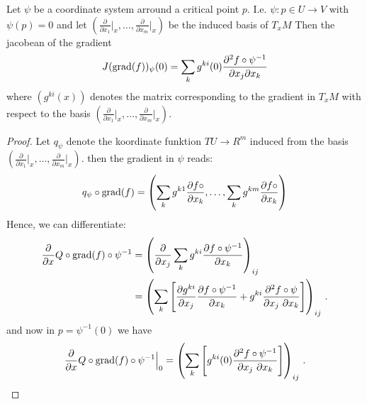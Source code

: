 \begin{lemma}
	Let $\psi$ be a coordinate system arround a critical point $p$. I.e. $\psi: p\in U\to V$ with $\psi(p)=0$ and let $\left( \frac{\partial}{\partial x_1}\big|_x,\dots ,\frac{\partial}{\partial x_m}\big|_x\right)$ be the induced basis of $T_xM$ Then the jacobean of the gradient 
	\begin{equation}
			J(\mathrm{grad}(f))_\psi(0)= \sum_{k}g^{ki}(0)\frac{\partial ^2 f\circ \psi^{-1} }{\partial x_j \partial x_k}
	\end{equation} where $(g^{ki}(x))$ denotes the matrix corresponding to the gradient in $T_xM$ with respect to the basis $\left( \frac{\partial}{\partial x_1}\big|_x,\dots ,\frac{\partial}{\partial x_m}\big|_x\right)$.
\end{lemma}
\begin{proof}
	Let $q_{\psi}$ denote the koordinate funktion $TU\to R^m$ induced from the basis $\left( \frac{\partial}{\partial x_1}\big|_x,\dots ,\frac{\partial}{\partial x_m}\big|_x\right)$. then the gradient in $\psi$ reads:
	\begin{align*}
		q_{\psi}\circ \mathrm{grad}(f)=\left(\sum_kg^{k1  }\frac{\partial f\circ	}{\partial x_k},\dots, \sum_kg^{k m }\frac{\partial f\circ	}{\partial x_k}\right)
	\end{align*}
	Hence, we can differentiate: 
	\begin{align*}
		\frac{\partial}{\partial x}  Q\circ \mathrm{grad}(f)\circ \psi^{-1}
		&= \left(\frac{\partial}{\partial x_j} \sum_k g^{ki}\frac{\partial f \circ \psi^{-1}}{\partial x_k}\right)_{ij} \\
		&= \left(\sum_k \left[ 
		\frac{\partial g^{ki}}{\partial x_j}\frac{\partial f \circ \psi^{-1}}{\partial x_k} +  g^{ki}\frac{\partial^2 f \circ \psi}{\partial x_j ~\partial x_k}
		\right]\right)_{ij} \, .
	\end{align*}
	and now in $p=\psi^{-1}(0)$ we have
	\begin{align*}
		\frac{\partial}{\partial x}  Q\circ \mathrm{grad}(f)\circ \psi^{-1} \Big|_{0}=\left(\sum_k \left[ 
		g^{ki}(0)\frac{\partial^2 f \circ \psi^{-1}}{\partial x_j ~\partial x_k}
		\right]\right)_{ij} \, .
	\end{align*}
\end{proof}








